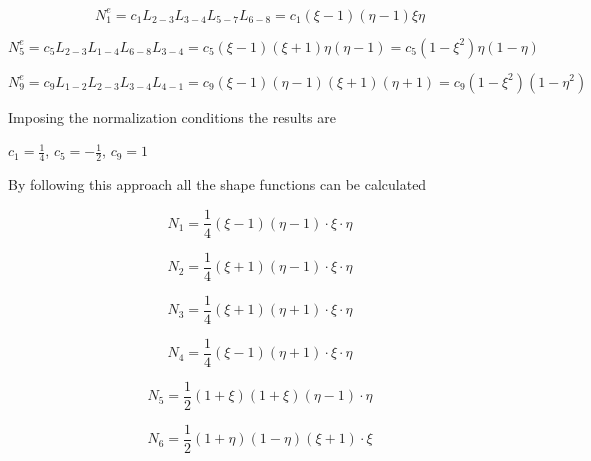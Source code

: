 \begin{equation} \label{eq: Quad8_1}
N_1^e = c_1 L_{2-3}L_{3-4}L_{5-7} L_{6-8} = c_1 \left(\xi - 1\right) \left(\eta -1\right) \xi \eta
\end{equation}

\begin{equation} \label{eq: Quad8_2}
N_5^e = c_5L_{2-3} L_{1-4} L_{6-8} L_{3-4} = c_5 \left(\xi -1 \right) \left( \xi +1\right) \eta \left( \eta -1\right) = c_5 \left(1-\xi^2\right) \eta \left(1 - \eta\right)
\end{equation}

\begin{equation} \label{eq: Quad8_3}
N_9^e = c_9L_{1-2} L_{2-3} L_{3-4} L_{4-1} = c_9 \left(\xi -1 \right) \left( \eta - 1\right) \left(\xi + 1\right) \left( \eta + 1\right) = c_9 \left(1-\xi^2\right) \left(1 - \eta^2\right)
\end{equation}

Imposing the normalization conditions the results are 

\begin{center}
	$c_1 = \frac{1}{4}$, \quad $c_5 = -\frac{1}{2}$, $c_9 = 1$
\end{center}

By following this approach all the shape functions can be calculated

\begin{equation}
N_1 = \frac{1}{4} \left(\xi - 1\right) \left( \eta -1 \right) \cdot\xi \cdot\eta
\end{equation}

\begin{equation}
N_2 = \frac{1}{4} \left(\xi + 1\right) \left( \eta -1 \right) \cdot\xi \cdot\eta
\end{equation}

\begin{equation}
N_3 = \frac{1}{4} \left(\xi + 1\right) \left( \eta + 1 \right) \cdot\xi \cdot\eta
\end{equation}

\begin{equation}
N_4 = \frac{1}{4} \left(\xi - 1\right) \left( \eta + 1 \right) \cdot\xi \cdot\eta
\end{equation}

\begin{equation}
N_5 = \frac{1}{2} \left(1 + \xi \right) \left( 1 + \xi \right)  \left( \eta - 1\right) \cdot\eta
\end{equation}

\begin{equation}
N_6 = \frac{1}{2} \left(1 + \eta \right) \left( 1 - \eta \right)  \left( \xi + 1\right) \cdot\xi
\end{equation}

